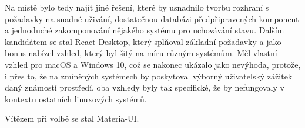 Na místě bylo tedy najít jiné řešení, které by usnadnilo tvorbu rozhraní s požadavky na snadné uživání, dostatečnou databázi předpřipravených komponent a jednoduché zakomponování nějakého systému pro uchovávání stavu. Dalším kandidátem se stal React Desktop, který splňoval základní požadavky a jako bonus nabízel vzhled, který byl šitý na míru různým systémům. Měl vlastní vzhled pro macOS a Windows 10, což se nakonec ukázalo jako nevýhoda, protože, i přes to, že na zmíněných systémech by poskytoval výborný uživatelský zážitek daný známostí prostředí, oba vzhledy byly tak specifické, že by nefungovaly v kontextu ostatních linuxových systémů.

Vítězem při volbě se stal Materia-UI.




